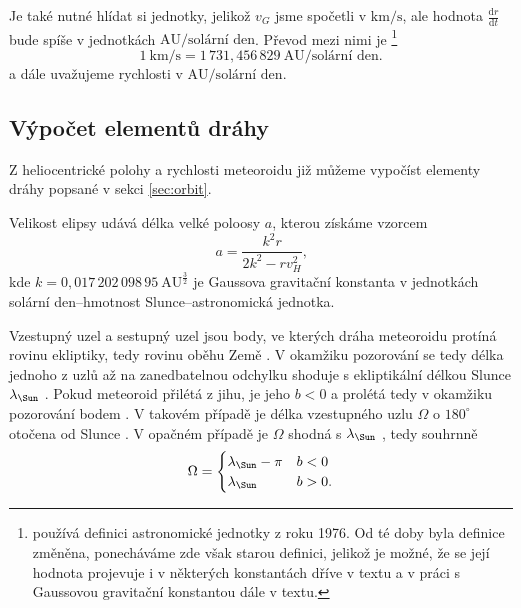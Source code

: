 Je také nutné hlídat si jednotky, jelikož $v_G$ jsme spočetli v $\text{km/s}$, ale hodnota $\frac{\text{d}r}{\text{d}t}$ bude spíše v jednotkách $\text{AU/solární den}$. Převod mezi nimi je \cite{ceplecha}\footnote{\cite{ceplecha} používá definici astronomické jednotky z roku 1976. Od té doby byla definice změněna, ponecháváme zde však starou definici, jelikož je možné, že se její hodnota projevuje i v některých konstantách dříve v textu a v práci s Gaussovou gravitační konstantou dále v textu.}
$$
    1\:\text{km/s}=1\,731{,}456\,829\:\text{AU/solární den.}
$$
a dále uvažujeme rychlosti v $\text{AU/solární den}$.

\subsection{Výpočet elementů dráhy}%
Z heliocentrické polohy a rychlosti meteoroidu již můžeme vypočíst elementy dráhy popsané v sekci \ref{sec:orbit}.

\smallskip

Velikost elipsy udává délka velké poloosy $a$, kterou získáme vzorcem \cite{ceplecha}
\begin{equation}
    a=\frac{k^2 r}{2k^2-r v_H^2}\text{,}
\end{equation}
kde $k=0{,}017\,202\,098\,95\:\text{AU}^\frac{3}{2}$ je Gaussova gravitační konstanta \cite{ceplecha} v jednotkách solární den--hmotnost Slunce--astronomická jednotka.

Vzestupný uzel {\NorthNode} a sestupný uzel {\SouthNode} jsou body, ve kterých dráha meteoroidu protíná rovinu ekliptiky, tedy rovinu oběhu Země \cite{astro}. V okamžiku pozorování se tedy délka jednoho z uzlů až na zanedbatelnou odchylku shoduje s ekliptikální délkou Slunce $\lambda_\text{\Sun}$ \cite{ceplecha}. Pokud meteoroid přilétá z jihu, je jeho $b < 0$ a prolétá tedy v okamžiku pozorování bodem {\NorthNode}. V takovém případě je délka vzestupného uzlu $\Omega$ o $180^\circ$ otočena od Slunce \cite{ceplecha}. V opačném případě je $\Omega$ shodná s $\lambda_\text{\Sun}$ \cite{ceplecha}, tedy souhrnně
\begin{equation}
    \Omega=\begin{cases}
        \lambda_\text{\Sun}-\pi & b<0 \\
        \lambda_\text{\Sun}     & b>0 \text{.}
    \end{cases}
\end{equation}

